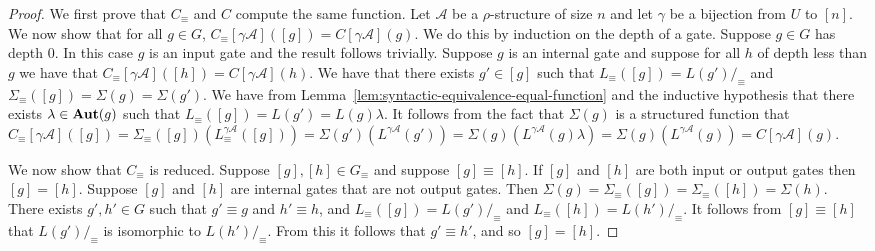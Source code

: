 \documentclass[../paper.tex]{subfiles}
\begin{document}
\begin{proof}
  We first prove that $C_\equiv$ and $C$ compute the same function. Let
  $\mathcal{A}$ be a $\rho$-structure of size $n$ and let $\gamma$ be a
  bijection from $U$ to $[n]$. We now show that for all $g \in G$, $C_\equiv
  [\gamma \mathcal{A}]([g]) = C[\gamma \mathcal{A}](g)$. We do this by induction
  on the depth of a gate. Suppose $g \in G$ has depth $0$. In this case $g$ is
  an input gate and the result follows trivially. Suppose $g$ is an internal
  gate and suppose for all $h$ of depth less than $g$ we have that
  $C_\equiv[\gamma \mathcal{A}]([h]) = C[\gamma \mathcal{A}](h)$. We have that
  there exists $g' \in [g]$ such that $L_\equiv ([g]) = L(g') /_\equiv$ and
  $\Sigma_\equiv([g]) = \Sigma (g) = \Sigma (g')$. We have from
  Lemma~\ref{lem:syntactic-equivalence-equal-function} and the inductive
  hypothesis that there exists $\lambda \in \text{\textbf{Aut}}(g)$ such that $L_\equiv ([g]) =
  L(g') = L(g) \lambda$. It follows from the fact that $\Sigma(g)$ is a
  structured function that $C_\equiv[\gamma \mathcal{A}]([g]) = \Sigma_\equiv
  ([g])(L^{\gamma \mathcal{A}}_\equiv([g])) = \Sigma (g') (L^{\gamma
    \mathcal{A}}(g')) = \Sigma (g)(L^{\gamma \mathcal{A}}(g) \lambda) = \Sigma
  (g) (L^{\gamma \mathcal{A}}(g)) = C[\gamma \mathcal{A}](g)$.
  
  We now show that $C_\equiv$ is reduced. Suppose $[g], [h] \in G_\equiv$ and
  suppose $[g] \equiv [h]$. If $[g]$ and $[h]$ are both input or output gates
  then $[g] = [h]$. Suppose $[g]$ and $[h]$ are internal gates that are not
  output gates. Then $\Sigma (g) = \Sigma_\equiv ([g]) = \Sigma_\equiv([h]) =
  \Sigma(h)$. There exists $g', h' \in G$ such that $g' \equiv g$ and $h' \equiv
  h$, and $L_\equiv ([g]) = L(g') /_\equiv$ and $L_\equiv ([h]) = L(h')
  /_\equiv$. It follows from $[g] \equiv [h]$ that $L(g') /_\equiv$ is
  isomorphic to $L(h') /_\equiv$. From this it follows that $g' \equiv h'$, and
  so $[g] = [h]$.


\end{proof}
\end{document}
